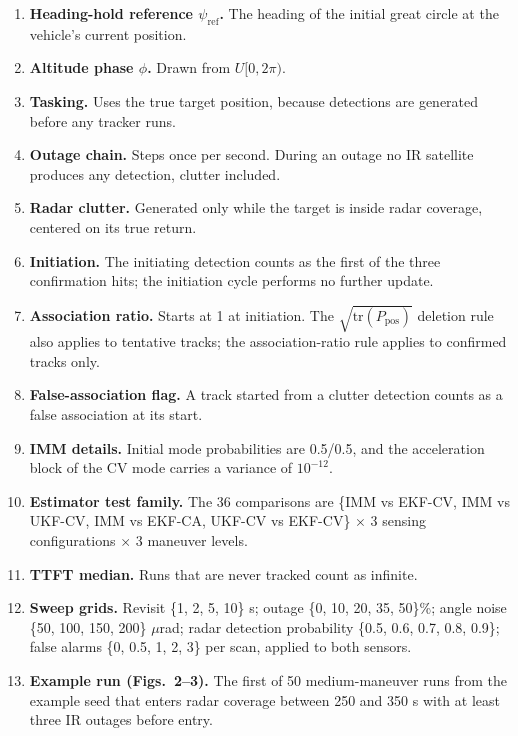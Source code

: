 \documentclass[11pt,a4paper]{article}
\begin{document}
\begin{enumerate}[leftmargin=*,itemsep=2pt]
\item \textbf{Heading-hold reference $\psi_{\mathrm{ref}}$.} The heading of the initial great circle at the vehicle's current position.
\item \textbf{Altitude phase $\phi$.} Drawn from $U[0, 2\pi)$.
\item \textbf{Tasking.} Uses the true target position, because detections are generated before any tracker runs.
\item \textbf{Outage chain.} Steps once per second. During an outage no IR satellite produces any detection, clutter included.
\item \textbf{Radar clutter.} Generated only while the target is inside radar coverage, centered on its true return.
\item \textbf{Initiation.} The initiating detection counts as the first of the three confirmation hits; the initiation cycle performs no further update.
\item \textbf{Association ratio.} Starts at 1 at initiation. The $\sqrt{\mathrm{tr}(P_{\mathrm{pos}})}$ deletion rule also applies to tentative tracks; the association-ratio rule applies to confirmed tracks only.
\item \textbf{False-association flag.} A track started from a clutter detection counts as a false association at its start.
\item \textbf{IMM details.} Initial mode probabilities are 0.5/0.5, and the acceleration block of the CV mode carries a variance of $10^{-12}$.
\item \textbf{Estimator test family.} The 36 comparisons are \{IMM vs EKF-CV, IMM vs UKF-CV, IMM vs EKF-CA, UKF-CV vs EKF-CV\} $\times$ 3 sensing configurations $\times$ 3 maneuver levels.
\item \textbf{TTFT median.} Runs that are never tracked count as infinite.
\item \textbf{Sweep grids.} Revisit \{1, 2, 5, 10\} s; outage \{0, 10, 20, 35, 50\}\%; angle noise \{50, 100, 150, 200\} $\mu$rad; radar detection probability \{0.5, 0.6, 0.7, 0.8, 0.9\}; false alarms \{0, 0.5, 1, 2, 3\} per scan, applied to both sensors.
\item \textbf{Example run (Figs.~2--3).} The first of 50 medium-maneuver runs from the example seed that enters radar coverage between 250 and 350 s with at least three IR outages before entry.
\end{enumerate}
\end{document}
